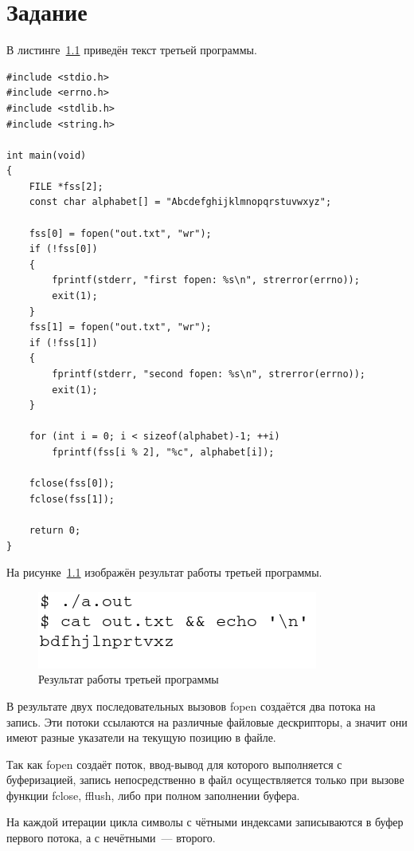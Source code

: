 \chapter{Задание }

В листинге~\ref{img:task03} приведён текст третьей программы.

\begin{lstlisting}[label=img:task03,caption={Текст третьей программы}]
#include <stdio.h>
#include <errno.h>
#include <stdlib.h>
#include <string.h>

int main(void)
{
    FILE *fss[2];
    const char alphabet[] = "Abcdefghijklmnopqrstuvwxyz";

    fss[0] = fopen("out.txt", "wr");
    if (!fss[0])
    {
        fprintf(stderr, "first fopen: %s\n", strerror(errno));
        exit(1);
    }
    fss[1] = fopen("out.txt", "wr");
    if (!fss[1])
    {
        fprintf(stderr, "second fopen: %s\n", strerror(errno));
        exit(1);
    }

    for (int i = 0; i < sizeof(alphabet)-1; ++i)
        fprintf(fss[i % 2], "%c", alphabet[i]);

    fclose(fss[0]);
    fclose(fss[1]);

    return 0;
}
\end{lstlisting}

На рисунке~\ref{img:task03} изображён результат работы третьей программы.

\begin{figure}[H]
    \includegraphics[scale=0.5]{images/task03.png}
    \caption{Результат работы третьей программы}\label{img:task03}
\end{figure}

В результате двух последовательных вызовов fopen создаётся два потока на запись. Эти потоки ссылаются на различные файловые дескрипторы, а значит они имеют разные указатели на текущую позицию в файле.

Так как fopen создаёт поток, ввод-вывод для которого выполняется с буферизацией, запись непосредственно в файл осуществляется только при вызове функции fclose, fflush, либо при полном заполнении буфера.

На каждой итерации цикла символы с чётными индексами записываются в буфер первого потока, а с нечётными~--- второго.

